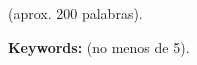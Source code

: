 \chapter*{\runtitle}

\noindent  (aprox. 200 palabras).

\bigskip

\noindent\textbf{Keywords:} (no menos de 5).